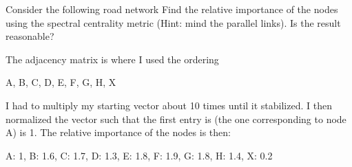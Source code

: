 
Consider the following road network
Find the relative importance of the nodes using the spectral centrality metric (Hint: mind the parallel links). Is the result reasonable?

\solution

The adjacency matrix is 
where I used the ordering 
\begin{center}
A, B, C, D, E, F, G, H, X  
\end{center}
I had to multiply my starting vector about 10 times until it stabilized. I then normalized the vector such that the first entry is (the one corresponding to node A) is 1. The relative importance of the nodes is then:
\begin{center}
A: 1, B: 1.6, C: 1.7, D: 1.3, E: 1.8, F: 1.9, G: 1.8, H: 1.4, X: 0.2
\end{center}



